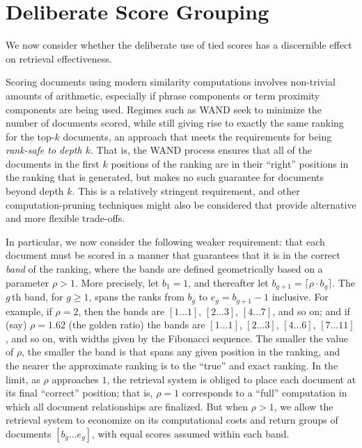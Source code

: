\section{Deliberate Score Grouping}
\label{sec-roundingoff}

We now consider whether the deliberate use of tied scores
has a discernible effect on retrieval effectiveness.


Scoring documents using modern similarity computations involves
non-trivial amounts of arithmetic, especially if phrase components or
term proximity components are being used.
Regimes such as WAND {\citep{bchsz03cikm}} seek to minimize the
number of documents scored, while still giving rise to exactly the
same ranking for the top-$k$ documents, an approach that meets the
requirements for being {\emph{rank-safe to depth $k$}}.
That is, the WAND process ensures that all of the documents in the
first $k$ positions of the ranking are in their ``right'' positions
in the ranking that is generated, but makes no such guarantee for
documents beyond depth $k$.
This is a relatively stringent requirement, and other
computation-pruning techniques might also be considered that provide
alternative and more flexible trade-offs.

In particular, we now consider the following weaker requirement: that
each document must be scored in a manner that guarantees that it is
in the correct {\emph{band}} of the ranking, where the bands are
defined geometrically based on a parameter $\rho>1$.
More precisely, let $b_1=1$, and thereafter let
$b_{g+1}=\lceil{\rho\cdot b_g}\rceil$.
The $g$\,th band, for $g\ge1$, spans the ranks from $b_g$ to
$e_g=b_{g+1}-1$ inclusive.
For example, if $\rho=2$, then the bands are $[1\ldots1]$,
$[2\ldots3]$, $[4\ldots7]$, and so on; and if (say) $\rho=1.62$ (the
golden ratio) the bands are $[1\ldots1]$, $[2\ldots3]$, $[4\ldots6]$,
$[7\ldots11]$, and so on, with widths given by the Fibonacci
sequence.
The smaller the value of $\rho$, the smaller the band is that spans
any given position in the ranking, and the nearer the approximate
ranking is to the ``true'' and exact ranking.
In the limit, as $\rho$ approaches $1$, the retrieval system is
obliged to place each document at its final ``correct'' position; that is,
$\rho=1$ corresponds to a ``full'' computation in which all document
relationships are finalized.
But when $\rho>1$, we allow the retrieval system to economize on its
computational costs and return groups of documents $[b_g\ldots e_g]$,
with equal scores assumed within each band.

